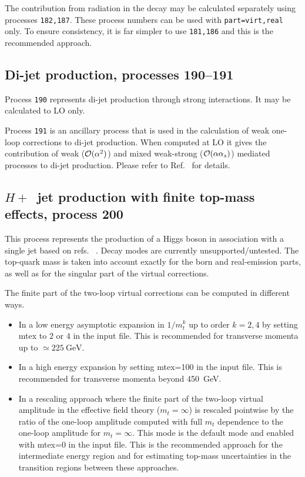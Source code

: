 The contribution from radiation in the decay may be calculated separately using
processes {\tt 182,187}. These process numbers can be used with {\tt part=virt,real}
only. To ensure consistency, it is far simpler to use {\tt 181,186}
and this is the recommended approach.

\subsection{Di-jet production, processes 190--191}
\label{subsec:dijet}

Process {\tt 190} represents di-jet production through strong interactions.
It may be calculated to LO only.

Process {\tt 191} is an ancillary process that is used in the calculation of
weak one-loop corrections to di-jet production.  When computed at LO it gives the
contribution of weak (${\cal O}(\alpha^2)$) and mixed weak-strong (${\cal O}(\alpha\alpha_s)$)
mediated processes to di-jet production.  Please refer to Ref.~\cite{Campbell:2016dks} for details.

\subsection{$H+$~jet production with finite top-mass effects, process 200}
\label{subsec:hjetma}
This process represents the production of a Higgs boson in association with a single jet based on refs.~ 
\cite{Neumann:2016dny,Neumann:2018bsx,Budge:2020oyl}. Decay modes are currently unsupported/untested. The top-quark mass is taken 
into account 
exactly for the born and real-emission parts, as well as for the singular part of the virtual corrections.

The finite part of the two-loop virtual corrections can be computed in different ways.
\begin{itemize}
    \item In a low energy asymptotic expansion in $1/m_t^k$ up to order $k=2,4$ by setting mtex to $2$ or $4$ in the 
    input file. This is recommended for transverse momenta up to $\simeq\SI{225}{\GeV}$.
    \item In a high energy expansion by setting mtex=100 in the input file. This is recommended for transverse momenta 
    beyond \SI{450}{\GeV}.
    \item In a rescaling approach where the finite part of the two-loop virtual amplitude in the effective field theory 
    ($m_t=\infty$) is rescaled pointwise by the ratio of the one-loop amplitude computed with full $m_t$ dependence to 
    the one-loop amplitude for $m_t=\infty$. This mode is the default mode and enabled with mtex=0 in the input file. 
    This is the recommended approach for the intermediate energy region and for estimating top-mass uncertainties in 
    the transition regions between these approaches.
\end{itemize}

